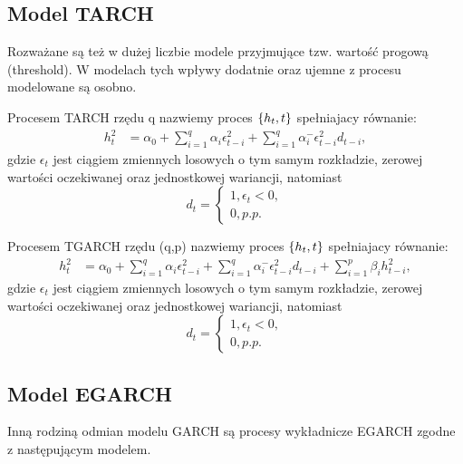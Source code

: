 \documentclass[10pt,a4paper]{book}
\begin{document}
\subsection{Model TARCH}

Rozważane są też w dużej liczbie modele przyjmujące tzw. wartość progową (threshold). W modelach tych wpływy dodatnie oraz ujemne z procesu modelowane są osobno.

\begin{definition}
Procesem TARCH rzędu q nazwiemy proces $\left\lbrace {{h_t}, {t}} \right\rbrace$ spełniajacy równanie:
\begin{align*}
h_t^2 &= \alpha_0 + \sum_{i=1}^{q} \alpha_i \epsilon^2_{t-i} + \sum_{i=1}^{q} \alpha^{-}_i \epsilon^2_{t-i} d_{t-i},
\end{align*}
gdzie $\epsilon_t$ jest ciągiem zmiennych losowych o tym samym rozkładzie, zerowej wartości oczekiwanej oraz jednostkowej wariancji, natomiast
$$
d_t = \begin{cases} 1, \epsilon_t < 0, \\ 0, p.p. \end{cases}
$$

\end{definition}

\begin{definition}
Procesem TGARCH rzędu (q,p) nazwiemy proces $\left\lbrace {{h_t}, {t}} \right\rbrace$ spełniajacy równanie:
\begin{align*}
h_t^2 &= \alpha_0 + \sum_{i=1}^{q} \alpha_i \epsilon^2_{t-i} + \sum_{i=1}^{q} \alpha^{-}_i \epsilon^2_{t-i} d_{t-i} + \sum_{i=1}^{p} \beta_{i} h_{t-i}^2,
\end{align*}
gdzie $\epsilon_t$ jest ciągiem zmiennych losowych o tym samym rozkładzie, zerowej wartości oczekiwanej oraz jednostkowej wariancji, natomiast
$$
d_t = \begin{cases} 1, \epsilon_t < 0, \\ 0, p.p. \end{cases}
$$
\end{definition}

\subsection{Model EGARCH}

Inną rodziną odmian modelu GARCH są procesy wykładnicze EGARCH zgodne z następującym modelem.
\end{document}
